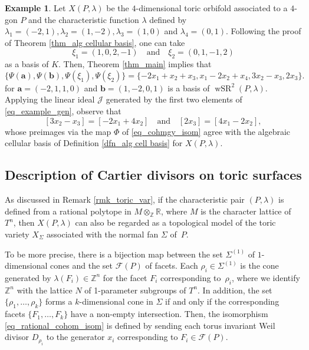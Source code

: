 \documentclass[10pt]{amsart}
\theoremstyle{plain}
\theoremstyle{definition}
\newtheorem{example}[theorem]{Example}
\numberwithin{equation}{section}
\newcommand{\RR}{\mathbb{R}}
\newcommand{\ZZ}{\mathbb{Z}}
\DeclareMathOperator{\wSR}{wSR}
\begin{document}
\begin{example}
Let $X(P,\lambda)$ be the $4$-dimensional toric orbifold associated to a $4$-gon $P$ and the characteristic function $\lambda$ defined by $\lambda_1=(-2,1), \lambda_2=(1,-2), \lambda_3=(1,0)$ and $\lambda_4=(0,1)$. 
Following the proof of Theorem \ref{thm_alg cellular basis}, one can take 
\[
\xi_1=(1,0,2,-1) \quad \text{and} \quad \xi_2=(0,1,-1,2)
\]
as a basis of $K$. Then, Theorem \ref{thm_main} implies that 
\begin{equation}\label{eq_example_gen}
\{\Psi(\mathbf{a}), \Psi(\mathbf{b}), \Psi(\xi_1), \Psi(\xi_2)\}=
\{-2x_1+x_2+x_3, x_1-2x_2+x_4, 3x_2-x_3, 2x_3\}.
\end{equation}
for $\mathbf{a}=(-2,1,1,0)$ and $\mathbf{b}=(1,-2,0,1)$ is a basis of $\wSR^2(P, \lambda)$. Applying the linear ideal $\mathcal{J}$ generated by the first two elements of \eqref{eq_example_gen}, observe that 
\[
[3x_2-x_3]=[-2x_1+4x_2] \quad \text{and} \quad [2x_3]= [4x_1-2x_2],
\]
whose preimages via the map $\Phi$ of \eqref{eq_cohmgy_isom} agree with the algebraic cellular basis of Definition \ref{dfn_alg cell basis} for  $X(P, \lambda)$.
\end{example}



\subsection{Description of Cartier divisors on toric surfaces}
As discussed in Remark \ref{rmk_toric_var}, if the characteristic pair $(P, \lambda)$ is defined from a rational polytope in $M\otimes_\ZZ \RR$, where $M$ is the character lattice of $T^n$, then $X(P, \lambda)$ can also be regarded as a topological model of the toric variety $X_\Sigma$ associated with the normal fan $\Sigma$ of~$P$.  

To be more precise, there is a bijection map between the set $\Sigma^{(1)}$ of $1$-dimensional cones and the set $\mathcal{F}(P)$ of facets. Each $\rho_i\in \Sigma^{(1)}$ is the cone generated by $\lambda(F_i)\in \ZZ^n$ for the facet $F_i$ corresponding to~$\rho_i$, where we identify $\ZZ^n$ with the lattice $N$ of 1-parameter subgroups of $T^n$. In addition, the set $\{\rho_1, \dots, \rho_k\}$ forms a $k$-dimensional cone in $\Sigma$ if and only if the corresponding facets $\{F_1, \dots, F_k\}$ have a non-empty intersection. Then, the isomorphism \eqref{eq_rational_cohom_isom} is defined by sending each torus invariant Weil divisor $D_{\rho_i}$ to the generator  $x_i$ corresponding to $F_i\in \mathcal{F}(P)$. 
\end{document}
